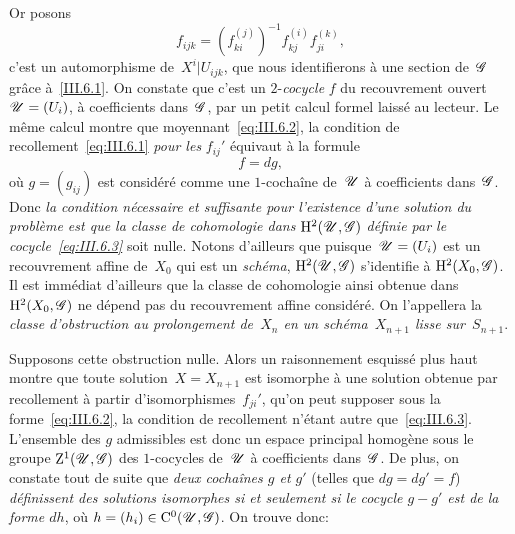Or posons
\begin{equation*}
\label{eq:III.6.3}
\tag{3}
{f_{ijk}=(f_{ki}^{(j)})^{-1}f_{kj}^{(i)}f_{ji}^{(k)},}
\end{equation*}
c'est un automorphisme de~$X^i|U_{ijk}$, que nous identifierons \`a
une section de~$\cal{G}$ gr\^ace \`a~\ref{III.6.1}. On constate
que c'est un $2$-\emph{cocycle} $f$ du recouvrement ouvert
$\cal{U}=(U_i)$, \`a coefficients dans~$\cal{G}$, par un petit
calcul formel laiss\'e au lecteur. Le m\^eme calcul montre que
moyennant~\eqref{eq:III.6.2}, la condition de
recollement~\eqref{eq:III.6.1} \emph{pour les} $f_{ij}'$ \'equivaut
\`a la formule
\begin{equation*}
\label{eq:III.6.4}
\tag{4} {f=dg,}
\end{equation*}
o\`u $g=(g_{ij})$ est consid\'er\'e comme une $1$-cocha\^ine
de~$\cal{U}$ \`a coefficients dans~$\cal{G}$. Donc \emph{la
condition nécessaire et suffisante pour l'existence d'une solution
du problème est que la classe de cohomologie dans
$\H^2(\cal{U},\cal{G})$ définie par le cocycle~\eqref{eq:III.6.3}}
soit nulle. Notons d'ailleurs que puisque~$\cal{U}=(U_i)$ est un
recouvrement affine de~$X_0$ qui est un \emph{schéma},
$\H^2(\cal{U},\cal{G})$ s'identifie \`a $\H^2(X_0,\cal{G})$. Il est
imm\'ediat d'ailleurs que la classe de cohomologie ainsi obtenue
dans $\H^2(X_0,\cal{G})$ ne d\'epend pas du recouvrement affine
consid\'er\'e. On l'appellera la \emph{classe d'obstruction au
prolongement de~$X_n$ en un schéma~$X_{n+1}$ lisse sur~$S_{n+1}$}.

Supposons cette obstruction nulle. Alors un raisonnement esquiss\'e
plus haut montre que toute solution~$X=X_{n+1}$ est isomorphe \`a
une solution obtenue par recollement \`a partir
d'isomorphismes~$f_{ji}'$, qu'on peut supposer sous la
forme~\eqref{eq:III.6.2}, la condition de recollement n'\'etant
autre que~\eqref{eq:III.6.3}. L'ensemble des $g$ admissibles est donc
un espace principal homog\`ene sous le groupe
$\mathrm{Z}^1(\cal{U},\cal{G})$ des $1$-cocycles de~$\cal{U}$ \`a
coefficients dans~$\cal{G}$. De plus, on constate tout de suite que
\emph{deux cochaînes $g$ et $g'$} (telles que $dg=dg'=f$)
\emph{définissent des solutions isomorphes si et seulement si le
cocycle $g-g'$ est de la forme $dh$}, o\`u
$h=(h_i)\in\mathrm{C}^0(\cal{U},\cal{G})$. On trouve donc:

